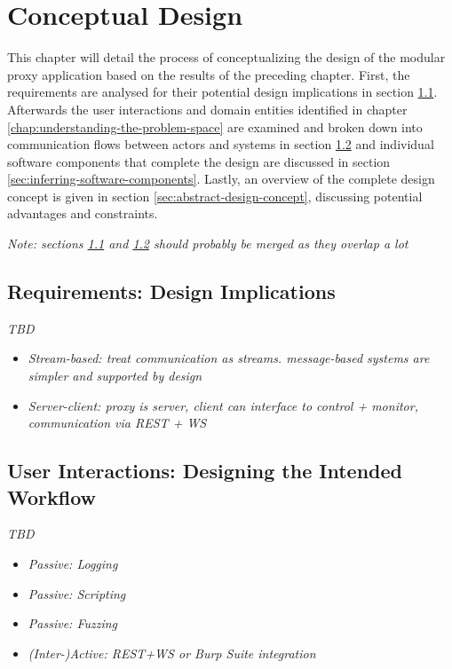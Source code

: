 \chapter{Conceptual Design}
\label{chap:conceptual-design}
This chapter will detail the process of conceptualizing the design of the modular proxy application based on the results of the preceding chapter. First, the requirements are analysed for their potential design implications in section \ref{sec:req-design-implications}. Afterwards the user interactions and domain entities identified in chapter \ref{chap:understanding-the-problem-space} are examined and broken down into communication flows between actors and systems in section \ref{sec:user-interactions-designing-workflow} and individual software components that complete the design are discussed in section \ref{sec:inferring-software-components}. Lastly, an overview of the complete design concept is given in section \ref{sec:abstract-design-concept}, discussing potential advantages and constraints.

\emph{Note: sections \ref{sec:req-design-implications} and \ref{sec:user-interactions-designing-workflow} should probably be merged as they overlap a lot} %

\section{Requirements: Design Implications}
\label{sec:req-design-implications}
\emph{TBD} %
\begin{itemize}
    \item \emph{Stream-based: treat communication as streams. message-based systems are simpler and supported by design}
    \item \emph{Server-client: proxy is server, client can interface to control + monitor, communication via REST + WS}
\end{itemize}

\section{User Interactions: Designing the Intended Workflow}
\label{sec:user-interactions-designing-workflow}
\emph{TBD} %
\begin{itemize}
    \item \emph{Passive: Logging}
    \item \emph{Passive: Scripting}
    \item \emph{Passive: Fuzzing}
    \item \emph{(Inter-)Active: REST+WS or Burp Suite integration}
\end{itemize}

